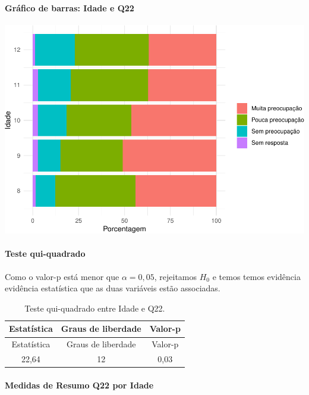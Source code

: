 \documentclass[]{article}
\let\oldparagraph\paragraph
\renewcommand{\paragraph}[1]{\oldparagraph{#1}\mbox{}}
\begin{document}
\hypertarget{gruxe1fico-de-barras-idade-e-q22}{%
\paragraph{Gráfico de barras: Idade e Q22}\label{gruxe1fico-de-barras-idade-e-q22}}

\begin{center}\includegraphics[width=0.75\linewidth]{relatorio_files/figure-latex/unnamed-chunk-379-1} \end{center}

\hypertarget{teste-qui-quadrado-44}{%
\paragraph{Teste qui-quadrado}\label{teste-qui-quadrado-44}}

Como o valor-p está menor que \(\alpha=0,05\), rejeitamos \(H_0\) e temos temos evidência evidência estatística que as duas variáveis estão associadas.

\begin{longtable}[]{@{}ccc@{}}
\caption{\label{tab:unnamed-chunk-380}Teste qui-quadrado entre Idade e Q22.}\tabularnewline
\toprule
Estatística & Graus de liberdade & Valor-p\tabularnewline
\midrule
\endfirsthead
\toprule
Estatística & Graus de liberdade & Valor-p\tabularnewline
\midrule
\endhead
22,64 & 12 & 0,03\tabularnewline
\bottomrule
\end{longtable}

\cleardoublepage

\hypertarget{medidas-de-resumo-q22-por-idade}{%
\paragraph{Medidas de Resumo Q22 por Idade}\label{medidas-de-resumo-q22-por-idade}}
\end{document}
